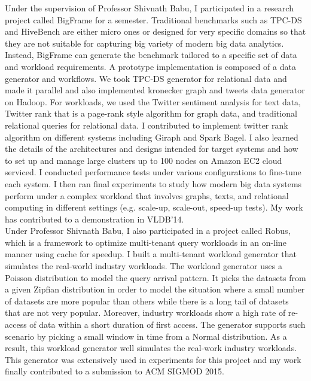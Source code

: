 \documentclass[11pt]{article}
\begin{document}
  Under the supervision of Professor Shivnath Babu, I participated in a research project called BigFrame for a semester. Traditional benchmarks such as TPC-DS and HiveBench are either micro ones or designed for very specific domains so that they are not suitable for capturing big variety of modern big data analytics. Instead, BigFrame can generate the benchmark tailored to a specific set of data and workload requirements. A prototype implementation is composed of a data generator and workflows. We took TPC-DS generator for relational data and made it parallel and also implemented kronecker graph and tweets data generator on Hadoop. For workloads, we used the Twitter sentiment analysis for text data, Twitter rank that is a page-rank style algorithm for graph data, and traditional relational queries for relational data. I contributed to implement twitter rank algorithm on different systems including Giraph and Spark Bagel. I also learned the details of the architectures and designs intended for target systems and how to set up and manage large clusters up to 100 nodes on Amazon EC2 cloud serviced. I conducted performance tests under various configurations to fine-tune each system. I then ran final experiments to study how modern big data systems perform under a complex workload that involves graphs, texts, and relational computing in different settings (e.g. scale-up, scale-out, speed-up tests). My work has contributed to a demonstration in VLDB’14.\\

  Under Professor Shivnath Babu, I also participated in a project called Robus, which is a framework to optimize multi-tenant query workloads in an on-line manner using cache for speedup. I built a multi-tenant workload generator that simulates the real-world industry workloads. The workload generator uses a Poisson distribution to model the query arrival pattern. It picks the datasets from a given Zipfian distribution in order to model the situation where a small number of datasets are more popular than others while there is a long tail of datasets that are not very popular. Moreover, industry workloads show a high rate of re-access of data within a short duration of first access. The generator supports such scenario by picking a small window in time from a Normal distribution. As a result, this workload generator well simulates the real-work industry workloads. This generator was extensively used in experiments for this project and my work finally contributed to a submission to ACM SIGMOD 2015. \\
\end{document}
